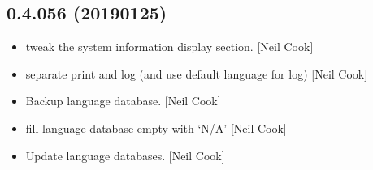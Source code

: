 \documentclass[a4paper,10pt,english]{report}
\begin{document}
\subsection{0.4.056 (2019\sphinxhyphen{}01\sphinxhyphen{}25)}
\label{\detokenize{misc/changelog:id227}}\begin{itemize}
\item {} 
 \sphinxhyphen{} tweak the system information display section. {[}Neil
Cook{]}

\item {} 
 \sphinxhyphen{} separate print and log (and use default language for log)
{[}Neil Cook{]}

\item {} 
Backup language database. {[}Neil Cook{]}

\item {} 
 \sphinxhyphen{} fill language database empty with ‘N/A’ {[}Neil Cook{]}

\item {} 
Update language databases. {[}Neil Cook{]}

\end{itemize}
\end{document}
